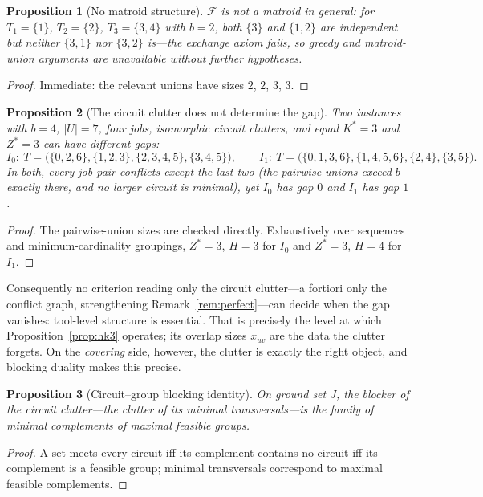 \documentclass[11pt,a4paper]{article}
\theoremstyle{plain}
\newtheorem{proposition}{Proposition}
\theoremstyle{definition}
\theoremstyle{remark}
\newcommand{\U}{U}
\newcommand{\Kst}{K^{\ast}}
\newcommand{\Zst}{Z^{\ast}}
\begin{document}
\begin{proposition}[No matroid structure]\label{prop:nonmatroid}
$\mathcal{F}$ is not a matroid in general: for $T_1=\{1\}$, $T_2=\{2\}$,
$T_3=\{3,4\}$ with $b=2$, both $\{3\}$ and $\{1,2\}$ are independent but
neither $\{3,1\}$ nor $\{3,2\}$ is---the exchange axiom fails, so greedy and
matroid-union arguments are unavailable without further hypotheses.
\end{proposition}
\begin{proof}
Immediate: the relevant unions have sizes $2$, $2$, $3$, $3$.
\end{proof}

\begin{proposition}[The circuit clutter does not determine the gap]
\label{prop:noclutter}
Two instances with $b=4$, $\lvert\U\rvert=7$, four jobs, isomorphic circuit
clutters, and equal $\Kst=3$ and $\Zst=3$ can have different gaps:
\[
  I_0:\ T=\bigl(\{0,2,6\},\{1,2,3\},\{2,3,4,5\},\{3,4,5\}\bigr),
  \qquad
  I_1:\ T=\bigl(\{0,1,3,6\},\{1,4,5,6\},\{2,4\},\{3,5\}\bigr).
\]
In both, every job pair conflicts except the last two (the pairwise unions
exceed $b$ exactly there, and no larger circuit is minimal), yet $I_0$ has
gap $0$ and $I_1$ has gap $1$.
\end{proposition}
\begin{proof}
The pairwise-union sizes are checked directly. Exhaustively over sequences and
minimum-cardinality groupings, $\Zst=3$, $H=3$ for $I_0$ and $\Zst=3$, $H=4$
for $I_1$.
\end{proof}
\noindent Consequently no criterion reading only the circuit clutter---a
fortiori only the conflict graph, strengthening Remark~\ref{rem:perfect}---can
decide when the gap vanishes: tool-level structure is essential. That is
precisely the level at which Proposition~\ref{prop:hk3} operates; its overlap
sizes $x_{uv}$ are the data the clutter forgets. On the \emph{covering} side,
however, the clutter is exactly the right object, and blocking duality makes
this precise.

\begin{proposition}[Circuit--group blocking identity]\label{prop:circblocker}
On ground set $J$, the blocker of the circuit clutter---the clutter of its
minimal transversals---is the family of minimal complements of maximal feasible
groups.
\end{proposition}
\begin{proof}
A set meets every circuit iff its complement contains no circuit iff its
complement is a feasible group; minimal transversals correspond to maximal
feasible complements.
\end{proof}
\end{document}
